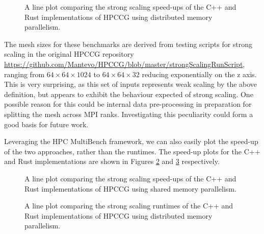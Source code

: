 \begin{figure}[H]
    \centering
    
    \caption{A line plot comparing the strong scaling speed-ups of the C++ and Rust implementations of HPCCG using distributed memory parallelism.}
    \label{fig:strong_scaling_mpi}
\end{figure}

The mesh sizes for these benchmarks are derived from testing scripts for strong scaling in the original HPCCG repository \url{https://github.com/Mantevo/HPCCG/blob/master/strongScalingRunScript}, ranging from $64 \times 64 \times 1024$ to $64 \times 64 \times 32$ reducing exponentially on the z axis. This is very surprising, as this set of inputs represents weak scaling by the above definition, but appears to exhibit the behaviour expected of strong scaling. One possible reason for this could be internal data pre-processing in preparation for splitting the mesh across MPI ranks. Investigating this peculiarity could form a good basis for future work.

Leveraging the HPC MultiBench framework, we can also easily plot the speed-up of the two approaches, rather than the runtimes. The speed-up plots for the C++ and Rust implementations are shown in Figures \ref{fig:strong_scaling_speedup_threaded} and \ref{fig:strong_scaling_speedup_mpi} respectively.

\begin{figure}[H]
    \centering
    
    \caption{A line plot comparing the strong scaling speed-ups of the C++ and Rust implementations of HPCCG using shared memory parallelism.}
    \label{fig:strong_scaling_speedup_threaded}
\end{figure}

\begin{figure}[H]
    \centering
    
    \caption{A line plot comparing the strong scaling runtimes of the C++ and Rust implementations of HPCCG using distributed memory parallelism.}
    \label{fig:strong_scaling_speedup_mpi}
\end{figure}


